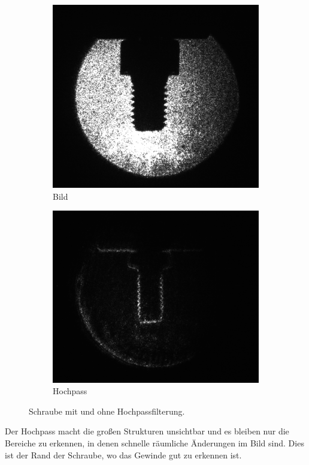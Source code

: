 \documentclass[
	a4paper,
	12pt,
	pagesize,
	ngerman
]{scrartcl}
\begin{document}
	\begin{figure}[H]
        \centering
        \begin{subfigure}[b]{0.475\textwidth}
            \centering
            \includegraphics[width=\textwidth]{raw/4/4_schraub}
            \caption%
            {Bild}
            \label{fig_4_schraub_bild}
        \end{subfigure}
        \hfill
        \begin{subfigure}[b]{0.475\textwidth}
            \centering
            \includegraphics[width=\textwidth]{raw/4/4_schraub_hochpass}
            \caption[]%
            {Hochpass}
            \label{fig_4_schraub_hochpass}
        \end{subfigure}
        \caption%
        {
				Schraube mit und ohne Hochpassfilterung.
				}
        \label{fig_4_schraub}
    \end{figure}
	Der Hochpass macht die großen Strukturen unsichtbar und es bleiben nur die Bereiche zu erkennen, in denen schnelle räumliche Änderungen im Bild sind.
	Dies ist der Rand der Schraube, wo das Gewinde gut zu erkennen ist.
\end{document}
